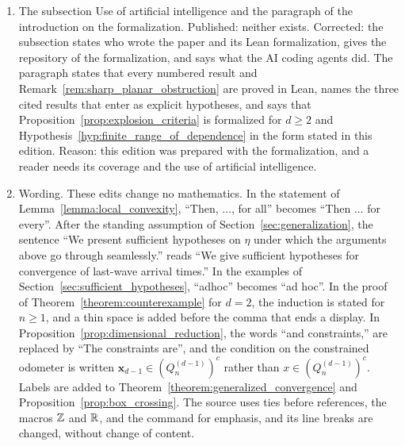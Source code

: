 \documentclass[12pt]{amsart}
\begin{document}
\begin{enumerate}
\item[C25.] The subsection Use of artificial intelligence and the paragraph of the introduction on the formalization. Published: neither exists. Corrected: the subsection states who wrote the paper and its Lean formalization, gives the repository of the formalization, and says what the AI coding agents did. The paragraph states that every numbered result and Remark~\ref{rem:sharp_planar_obstruction} are proved in Lean, names the three cited results that enter as explicit hypotheses, and says that Proposition~\ref{prop:explosion_criteria} is formalized for $d\geq2$ and Hypothesis~\ref{hyp:finite_range_of_dependence} in the form stated in this edition. Reason: this edition was prepared with the formalization, and a reader needs its coverage and the use of artificial intelligence.
\item[C26.] Wording. These edits change no mathematics. In the statement of Lemma~\ref{lemma:local_convexity}, ``Then, $\ldots$, for all'' becomes ``Then $\ldots$ for every''. After the standing assumption of Section~\ref{sec:generalization}, the sentence ``We present sufficient hypotheses on $\eta$ under which the arguments above go through seamlessly.'' reads ``We give sufficient hypotheses for convergence of last-wave arrival times.'' In the examples of Section~\ref{sec:sufficient_hypotheses}, ``adhoc'' becomes ``ad hoc''. In the proof of Theorem~\ref{theorem:counterexample} for $d=2$, the induction is stated for $n\geq1$, and a thin space is added before the comma that ends a display. In Proposition~\ref{prop:dimensional_reduction}, the words ``and constraints,'' are replaced by ``The constraints are'', and the condition on the constrained odometer is written $\mathbf x_{d-1}\in(Q_n^{(d-1)})^c$ rather than $x\in(Q_n^{(d-1)})^c$. Labels are added to Theorem~\ref{theorem:generalized_convergence} and Proposition~\ref{prop:box_crossing}. The source uses ties before references, the macros $\mathbb{Z}$ and $\mathbb{R}$, and the command for emphasis, and its line breaks are changed, without change of content.
\end{enumerate}

{}

\end{document}
